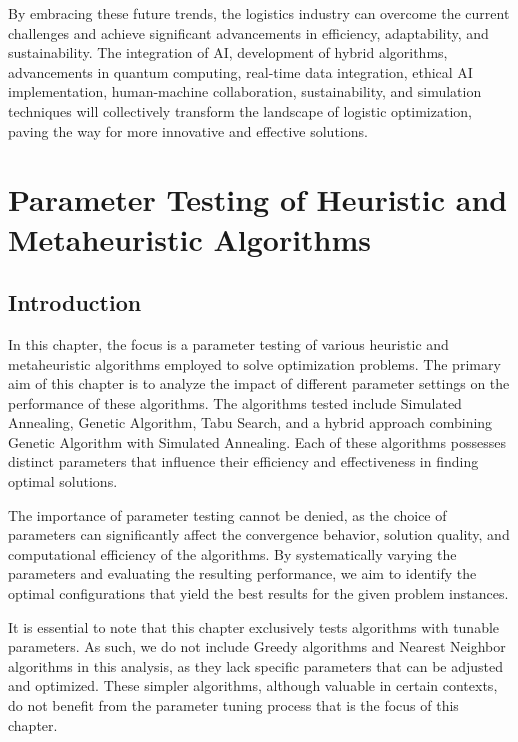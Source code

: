 \documentclass{article}
\begin{document}
    By embracing these future trends, the logistics industry can overcome the current challenges and achieve significant advancements in efficiency, adaptability, and sustainability. The integration of AI, development of hybrid algorithms, advancements in quantum computing, real-time data integration, ethical AI implementation, human-machine collaboration, sustainability, and simulation techniques will collectively transform the landscape of logistic optimization, paving the way for more innovative and effective solutions.


    \newpage


    \section{Parameter Testing of Heuristic and Metaheuristic Algorithms}\label{sec:parameter-testing-of-heuristic-and-metaheuristic-algorithms}

    \subsection{Introduction}\label{subsec:introduction2}

    In this chapter, the focus is a parameter testing of various heuristic and metaheuristic algorithms employed to solve optimization problems. The primary aim of this chapter is to analyze the impact of different parameter settings on the performance of these algorithms. The algorithms tested include Simulated Annealing, Genetic Algorithm, Tabu Search, and a hybrid approach combining Genetic Algorithm with Simulated Annealing. Each of these algorithms possesses distinct parameters that influence their efficiency and effectiveness in finding optimal solutions.

    The importance of parameter testing cannot be denied, as the choice of parameters can significantly affect the convergence behavior, solution quality, and computational efficiency of the algorithms. By systematically varying the parameters and evaluating the resulting performance, we aim to identify the optimal configurations that yield the best results for the given problem instances.

    It is essential to note that this chapter exclusively tests algorithms with tunable parameters. As such, we do not include Greedy algorithms and Nearest Neighbor algorithms in this analysis, as they lack specific parameters that can be adjusted and optimized. These simpler algorithms, although valuable in certain contexts, do not benefit from the parameter tuning process that is the focus of this chapter.
\end{document}
